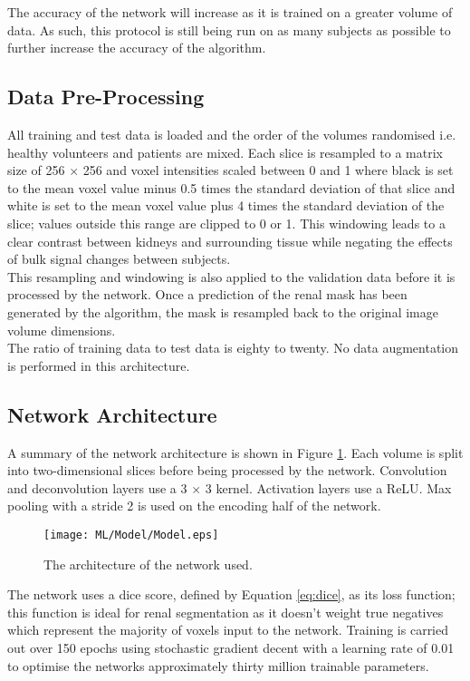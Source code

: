 The accuracy of the network will increase as it is trained on a greater volume of data. As such, this protocol is still being run on as many subjects as possible to further increase the accuracy of the algorithm.

\subsection{Data Pre-Processing}
All training and test data is loaded and the order of the volumes randomised i.e. healthy volunteers and patients are mixed. Each slice is resampled to a matrix size of 256 $\times$ 256 and voxel intensities scaled between 0 and 1 where black is set to the mean voxel value minus 0.5 times the standard deviation of that slice and white is set to the mean voxel value plus 4 times the standard deviation of the slice; values outside this range are clipped to 0 or 1. This windowing leads to a clear contrast between kidneys and surrounding tissue while negating the effects of bulk signal changes between subjects.\\

This resampling and windowing is also applied to the validation data before it is processed by the network. Once a prediction of the renal mask has been generated by the algorithm, the mask is resampled back to the original image volume dimensions.\\

The ratio of training data to test data is eighty to twenty. No data augmentation is performed in this architecture.\\

\subsection{Network Architecture}

A summary of the network architecture is shown in Figure \ref{fig:ml_network}. Each volume is split into two-dimensional slices before being processed by the network. Convolution and deconvolution layers use a 3 $\times$ 3 kernel. Activation layers use a \ac{ReLU}. Max pooling with a stride 2 is used on the encoding half of the network.

\begin{figure}[h]
	\centering
	\texttt{[image: ML/Model/Model.eps]}
	\caption{The architecture of the network used.}
	\label{fig:ml_network}	
\end{figure}

The network uses a dice score, defined by Equation \eqref{eq:dice}, as its loss function; this function is ideal for renal segmentation as it doesn't weight true negatives which represent the majority of voxels input to the network. Training is carried out over 150 epochs using stochastic gradient decent with a learning rate of 0.01 to optimise the networks approximately thirty million trainable parameters.

